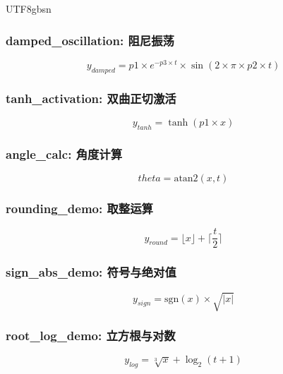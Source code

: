 \documentclass{article}
\begin{document}
\begin{CJK}{UTF8}{gbsn}
\subsubsection{damped_oscillation: 阻尼振荡}

\begin{equation}
    y_{damped} = p1 \times e^{-p3 \times t} \times \sin(2 \times \pi \times p2 \times t)
\end{equation}

\subsubsection{tanh_activation: 双曲正切激活}

\begin{equation}
    y_{tanh} = \tanh(p1 \times x)
\end{equation}

\subsubsection{angle_calc: 角度计算}

\begin{equation}
    theta = \text{atan2}(x, t)
\end{equation}

\subsubsection{rounding_demo: 取整运算}

\begin{equation}
    y_{round} = \lfloor x \rfloor + \lceil \frac{t}{2} \rceil
\end{equation}

\subsubsection{sign_abs_demo: 符号与绝对值}

\begin{equation}
    y_{sign} = \text{sgn}(x) \times \sqrt{|x|}
\end{equation}

\subsubsection{root_log_demo: 立方根与对数}

\begin{equation}
    y_{log} = \sqrt[3]{x} + \log_{2}(t + 1)
\end{equation}


\end{CJK}
\end{document}
